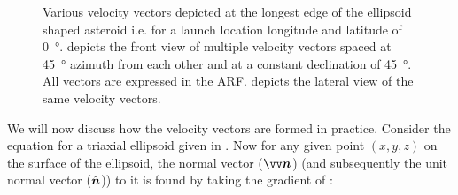 \begin{figure}[htb]
\centering
\captionsetup{justification=centering}
\caption{Various velocity vectors depicted at the longest edge of the ellipsoid shaped asteroid i.e. for a launch location longitude and latitude of \SI{0}{\degree}. \protect{} depicts the front view of multiple velocity vectors spaced at \SI{45}{\degree} azimuth from each other and at a constant declination of \SI{45}{\degree}. All vectors are expressed in the \gls{ARF}. \protect{} depicts the lateral view of the same velocity vectors.}
\label{fig:longest_edge_velocity_vector_cone}
\end{figure}
\FloatBarrier
We will now discuss how the velocity vectors are formed in practice. Consider the equation for a triaxial ellipsoid given in . Now for any given point $(x,y,z)$ on the surface of the ellipsoid, the normal vector ($\bv{n}$) (and subsequently the unit normal vector ($\hat{\bm{n}}$)) to it is found by taking the gradient of :
